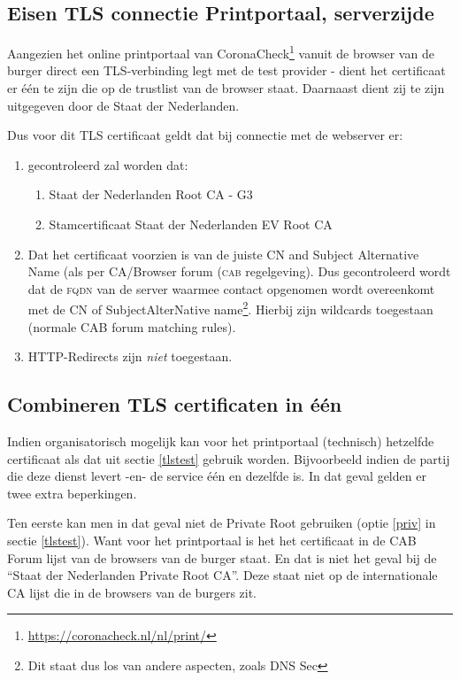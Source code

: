 \documentclass[11.0pt]{report}
\begin{document}
\subsection{Eisen TLS connectie Printportaal, serverzijde}

Aangezien het online printportaal van CoronaCheck\footnote{\url{https://coronacheck.nl/nl/print/}} vanuit de browser van de burger direct een TLS-verbinding legt met de test provider - dient het certificaat er één te zijn die op de trustlist van de browser staat. Daarnaast dient zij te zijn uitgegeven door de Staat der Nederlanden.

Dus voor dit TLS certificaat geldt dat bij connectie met de webserver er:

\begin{enumerate}
\item gecontroleerd zal worden dat: 
\begin{enumerate}
\item Staat der Nederlanden Root CA - G3
\item Stamcertificaat Staat der Nederlanden EV Root CA 
\end{enumerate}
\item Dat het certificaat voorzien is van de juiste CN and Subject Alternative Name (als per CA/Browser forum (\textsc{cab} regelgeving). Dus gecontroleerd wordt dat de \textsc{fqdn} van de server waarmee contact opgenomen wordt overeenkomt met de CN of SubjectAlterNative name\footnote{Dit staat dus los van andere aspecten, zoals DNS Sec}. Hierbij zijn wildcards toegestaan (normale CAB forum matching rules).
\item HTTP-Redirects zijn \emph{niet} toegestaan.
\end{enumerate}

\subsection{Combineren TLS certificaten in één}
\label{note}

Indien organisatorisch mogelijk kan voor het printportaal (technisch) hetzelfde certificaat als dat uit sectie \ref{tlstest} gebruik worden. Bijvoorbeeld indien de partij die deze dienst levert -en- de service één en dezelfde is. In dat geval gelden er twee extra beperkingen. 

Ten eerste kan men in dat geval niet de Private Root gebruiken (optie \ref{priv} in sectie \ref{tlstest}). Want voor het printportaal is het het certificaat in de CAB Forum lijst van de browsers van de burger staat. En dat is niet het geval bij de ``Staat der Nederlanden Private Root CA''. Deze staat niet op de internationale CA lijst die in de browsers van de burgers zit. 
\end{document}
